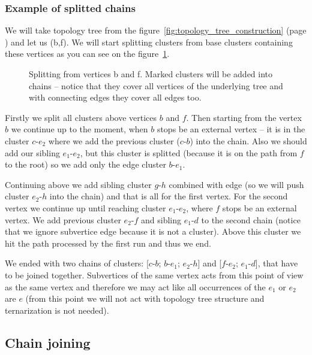 \subsubsection{Example of splitted chains}

We will take topology tree from the figure~\ref{fig:topology_tree_construction}
(page \pageref{fig:topology_tree_construction}) and let us \Expose(b,f). We will
start splitting clusters from base clusters containing these vertices as you
can see on the figure~\ref{fig:chain_clusters_example}.

\begin{figure}[H]
\centering
{}
\caption[Splitting clusters into chains]
{Splitting from vertices b and f. Marked clusters will be added into
chains -- notice that they cover all vertices of the underlying tree and with
connecting edges they cover all edges too.}
\label{fig:chain_clusters_example}
\end{figure}

Firstly we split all clusters above vertices $b$ and $f$. Then starting from the
vertex $b$ we continue up to the moment, when $b$ stops be an external vertex
-- it is in the cluster $c$-$e_2$ where we add the previous cluster ($c$-$b$)
into the chain. Also we should add our sibling $e_1$-$e_2$, but this cluster is
splitted (because it is on the path from $f$ to the root) so we add only the
edge cluster $b$-$e_1$.

Continuing above we add sibling cluster $g$-$h$ combined with edge (so we will
push cluster $e_2$-$h$ into the chain) and that is all for the first vertex.
For the second vertex we continue up until reaching cluster $e_1$-$e_2$, where
$f$ stops be an external vertex. We add previous cluster $e_2$-$f$ and sibling
$e_1$-$d$ to the second chain (notice that we ignore subvertice edge because it
is not a cluster). Above this cluster we hit the path processed by the first run
and thus we end.

We ended with two chains of clusters: [$c$-$b$; $b$-$e_1$; $e_2$-$h$] and
[$f$-$e_2$; $e_1$-$d$], that have to be joined together. Subvertices
of the same vertex acts from this point of view as the same vertex and therefore
we may act like all occurrences of the $e_1$ or $e_2$ are $e$ (from this point
we will not act with topology tree structure and ternarization is not needed).

\subsection{Chain joining}


